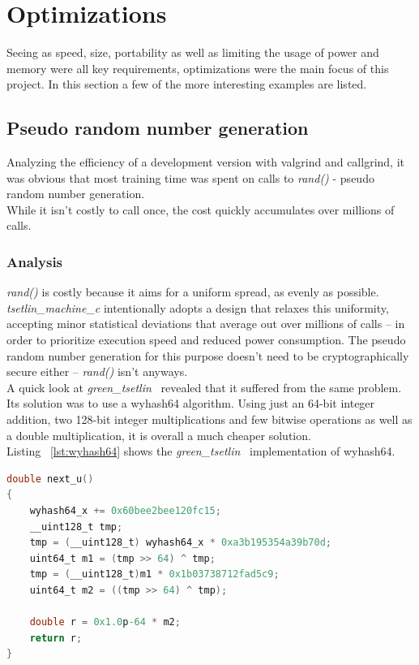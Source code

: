 \documentclass[english]{aghengthesis} %
\newcommand*{\LibraryName}{\emph{tsetlin\_machine\_c }}
\newcommand*{\GreenTsetlinName}{\emph{green\_tsetlin}~\cite{glimsdal2024greentsetlin} }
\begin{document}
\section{Optimizations}
Seeing as speed, size, portability as well as limiting the usage of power and memory were all key requirements, optimizations were the main focus of this project. In this section a few of the more interesting examples are listed.

\subsection{Pseudo random number generation}
Analyzing the efficiency of a development version with valgrind and callgrind, it was obvious that most training time was spent on calls to \textit{rand()} - pseudo random number generation. \\
While it isn't costly to call once, the cost quickly accumulates over millions of calls.

\subsubsection{Analysis}
\textit{rand()} is costly because it aims for a uniform spread, as evenly as possible. \LibraryName intentionally adopts a design that relaxes this uniformity, accepting minor statistical deviations that average out over millions of calls -- in order to prioritize execution speed and reduced power consumption. The pseudo random number generation for this purpose doesn't need to be cryptographically secure either -- \textit{rand()} isn't anyways. \\
A quick look at \GreenTsetlinName revealed that it suffered from the same problem. Its solution was to use a wyhash64 algorithm. Using just an 64-bit integer addition, two 128-bit integer multiplications and few bitwise operations as well as a double multiplication, it is overall a much cheaper solution.\\
Listing ~\ref{lst:wyhash64} shows the \GreenTsetlinName implementation of wyhash64.
\begin{lstlisting}[language=C,caption={[\GreenTsetlinName implementation of wyhash64]\GreenTsetlinName implementation of wyhash64},label=lst:wyhash64]
double next_u()
{
    wyhash64_x += 0x60bee2bee120fc15;
    __uint128_t tmp;
    tmp = (__uint128_t) wyhash64_x * 0xa3b195354a39b70d;
    uint64_t m1 = (tmp >> 64) ^ tmp;
    tmp = (__uint128_t)m1 * 0x1b03738712fad5c9;
    uint64_t m2 = ((tmp >> 64) ^ tmp);

    double r = 0x1.0p-64 * m2;
    return r;
}
\end{lstlisting}
\end{document}
